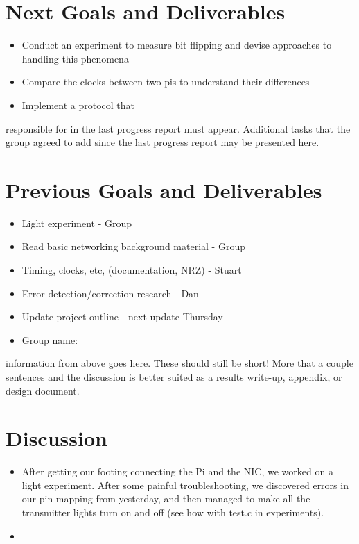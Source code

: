 \documentclass{article}
\begin{document}
\section*{Next Goals and Deliverables}
\begin{itemize}
\item Conduct an experiment to measure bit flipping and devise approaches to handling this phenomena
\item Compare the clocks between two pis to understand their differences
\item Implement a protocol that 

\end{itemize}

responsible for in the last progress report must appear. Additional tasks that the
group agreed to add since the last progress report may be presented here.
\section*{Previous Goals and Deliverables}
\begin{itemize}
    \item Light experiment - Group
    \item Read basic networking background material - Group
    \item Timing, clocks, etc, (documentation, NRZ) - Stuart
    \item Error detection/correction research - Dan
    \item Update project outline - next update Thursday
    \item Group name: 
\end{itemize}

information from above goes here. These should still be short! More that a couple
sentences and the discussion is better suited as a results write-up, appendix, or
design document.
\section*{Discussion}
\begin{itemize}
\item After getting our footing connecting the Pi and the NIC, we worked on a light experiment. After some
painful troubleshooting, we discovered errors in our pin mapping from yesterday, and then managed to make all
the transmitter lights turn on and off (see how with test.c in experiments).
\item 
\end{itemize}

\end{document}
